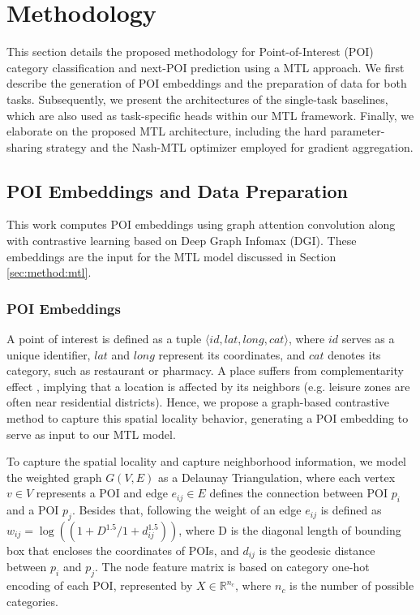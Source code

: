 \section{Methodology}
\label{sec:methodology}

This section details the proposed methodology for Point-of-Interest (POI) category classification and next-POI prediction using a MTL approach. We first describe the generation of POI embeddings and the preparation of data for both tasks. Subsequently, we present the architectures of the single-task baselines, which are also used as task-specific heads within our MTL framework. Finally, we elaborate on the proposed MTL architecture, including the hard parameter-sharing strategy and the Nash-MTL optimizer employed for gradient aggregation.


\subsection{POI Embeddings and Data Preparation}
\label{subsec:embeddings_data_prep}

This work computes POI embeddings using graph attention convolution along with contrastive learning based on Deep Graph Infomax (DGI). These embeddings are the input for the MTL model discussed in Section \ref{sec:method:mtl}.

\subsubsection{POI Embeddings}

A point of interest is defined as a tuple $\langle id, lat, long, cat \rangle$, where $id$ serves as a unique identifier, $lat$ and $long$ represent its coordinates, and $cat$ denotes its category, such as restaurant or pharmacy. A place suffers from complementarity effect \cite{du2019beyond}, implying that a location is affected by its neighbors (e.g. leisure zones are often near residential districts). Hence, we propose a graph-based contrastive method to capture this spatial locality behavior, generating a POI embedding to serve as input to our MTL model.

To capture the spatial locality and capture neighborhood information, we model the weighted graph $G(V, E)$ as a Delaunay Triangulation, where each vertex $v \in V$ represents a POI and edge $e_{ij} \in E$ defines the connection between POI $p_i$ and a POI $p_j$. Besides that, following \cite{huang2022estimating} the weight of an edge $e_{ij}$ is defined as $w_{ij} = \log((1+D^{1.5}/1+d_{ij}^{1.5}))$, where D is the diagonal length of bounding box that encloses the coordinates of POIs, and $d_{ij}$ is the geodesic distance between $p_{i}$ and $p_{j}$. The node feature matrix is based on category one-hot encoding of each POI, represented by $X \in \mathbb{R}^{n_c}$, where $n_c$ is the number of possible categories.

